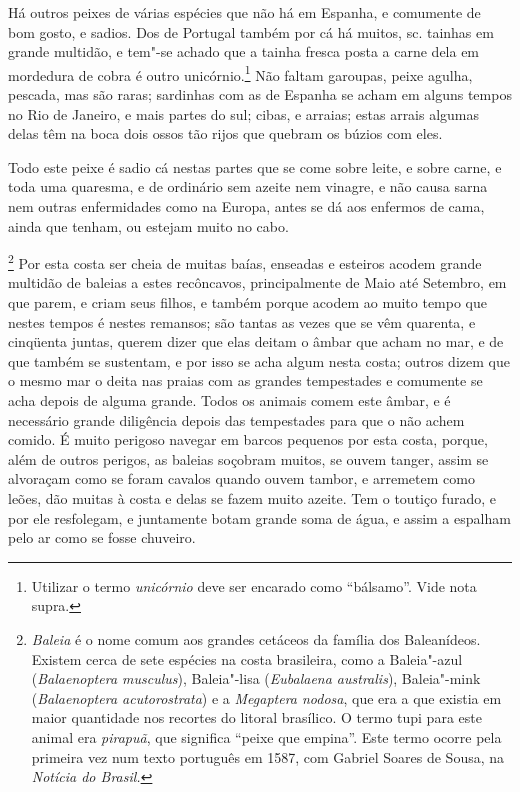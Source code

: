  Há outros peixes de várias espécies que não há em Espanha, e comumente
de bom gosto, e sadios. Dos de Portugal também por cá há muitos, sc.
tainhas em grande multidão, e tem"-se achado que a tainha fresca posta a
carne dela em mordedura de cobra é outro unicórnio.\footnote{ Utilizar 
o termo \textit{unicórnio} deve ser encarado como
``bálsamo''. Vide nota supra.} Não faltam garoupas, peixe agulha,
pescada, mas são raras; sardinhas com as de Espanha se acham em alguns
tempos no Rio de Janeiro, e mais partes do sul; cibas, e arraias; estas
arrais algumas delas têm na boca dois ossos tão rijos que quebram os búzios com eles. 

 Todo este peixe é sadio cá nestas partes que se come sobre leite, e
sobre carne, e toda uma quaresma, e de ordinário sem azeite nem
vinagre, e não causa sarna nem outras enfermidades como na Europa,
antes se dá aos enfermos de cama, ainda que tenham, ou estejam muito no cabo.

\footnote{ \textit{Baleia} é o nome comum aos grandes
cetáceos da família dos Baleanídeos. Existem cerca de sete espécies na
costa brasileira, como a Baleia"-azul (\textit{Balaenoptera musculus}), 
Baleia"-lisa (\textit{Eubalaena australis}), Baleia"-mink 
(\textit{Balaenoptera acutorostrata}) e a \textit{Megaptera nodosa}, 
que era a que existia em maior quantidade nos recortes do litoral
brasílico. O termo tupi para este animal era \textit{pirapuã}, que
significa ``peixe que empina''. Este termo ocorre pela primeira vez num
texto português em 1587, com Gabriel Soares de Sousa, na
\textit{Notícia do Brasil.}} Por esta costa ser cheia de
muitas baías, enseadas e esteiros acodem grande multidão de baleias a
estes recôncavos, principalmente de Maio até Setembro, em que parem, e
criam seus filhos, e também porque acodem ao muito tempo que nestes
tempos é nestes remansos; são tantas as vezes que se vêm quarenta, e
cinqüenta juntas, querem dizer que elas deitam o âmbar que acham no
mar, e de que também se sustentam, e por isso se acha algum nesta
costa; outros dizem que o mesmo mar o deita nas praias com as grandes
tempestades e comumente se acha depois de alguma grande. Todos os
animais comem este âmbar, e é necessário grande diligência depois das
tempestades para que o não achem comido. É muito perigoso navegar em
barcos pequenos por esta costa, porque, além de outros perigos, as
baleias soçobram muitos, se ouvem tanger, assim se alvoraçam como se
foram cavalos quando ouvem tambor, e arremetem como leões, dão muitas à
costa e delas se fazem muito azeite. Tem o toutiço furado, e por ele
resfolegam, e juntamente botam grande soma de água, e assim a espalham
pelo ar como se fosse chuveiro.

